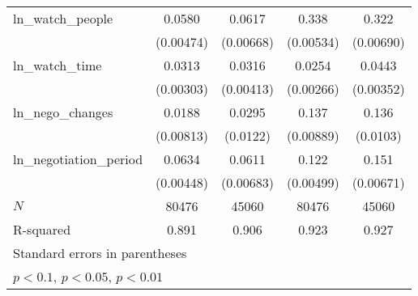 {\begin{tabular}{l*{4}{c}}
\addlinespace
ln\_watch\_people&      0.0580\sym{***}&      0.0617\sym{***}&       0.338\sym{***}&       0.322\sym{***}\\
            &   (0.00474)         &   (0.00668)         &   (0.00534)         &   (0.00690)         \\
\addlinespace
ln\_watch\_time&      0.0313\sym{***}&      0.0316\sym{***}&      0.0254\sym{***}&      0.0443\sym{***}\\
            &   (0.00303)         &   (0.00413)         &   (0.00266)         &   (0.00352)         \\
\addlinespace
ln\_nego\_changes&      0.0188\sym{**} &      0.0295\sym{**} &       0.137\sym{***}&       0.136\sym{***}\\
            &   (0.00813)         &    (0.0122)         &   (0.00889)         &    (0.0103)         \\
\addlinespace
ln\_negotiation\_period&      0.0634\sym{***}&      0.0611\sym{***}&       0.122\sym{***}&       0.151\sym{***}\\
            &   (0.00448)         &   (0.00683)         &   (0.00499)         &   (0.00671)         \\
\midrule
\(N\)       &       80476         &       45060         &       80476         &       45060         \\
R-squared   &       0.891         &       0.906         &       0.923         &       0.927         \\
\bottomrule
\multicolumn{5}{l}{\footnotesize Standard errors in parentheses}\\
\multicolumn{5}{l}{\footnotesize \sym{*} \(p<0.1\), \sym{**} \(p<0.05\), \sym{***} \(p<0.01\)}\\
\end{tabular}
}

